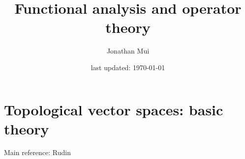 \documentclass[11pt]{article}
\title{Functional analysis and operator theory}
\author{Jonathan Mui}
\date{last updated: \today}
\begin{document}
	
	\maketitle
	
	\section{Topological vector spaces: basic theory}
	Main reference: Rudin
	
	
\end{document}
